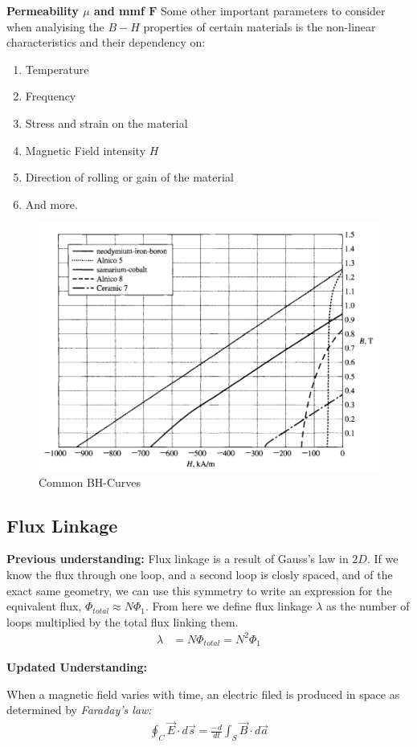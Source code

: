 \documentclass{book}
\begin{document}
\textbf{Permeability $\mu$ and mmf $\mathbf{F}$}
Some other important parameters to consider when analyising the $B-H$ properties of certain materials is the non-linear characteristics and their dependency on:
\begin{enumerate}
	\item Temperature
	\item Frequency
	\item Stress and strain on the material
	\item Magnetic Field intensity $H$
	\item Direction of rolling or gain of the material
	\item And more.
\end{enumerate}
\begin{figure}[h]
	\centering
	\includegraphics[width=0.5\linewidth]{Screenshots/Common_BH_Curves}
	\caption{Common BH-Curves}
	\label{fig:commonbhcurves}
\end{figure}

 
 \subsection{Flux Linkage}
 
 
 \textbf{Previous understanding:}
 Flux linkage is a result of Gauss's law in $2D$. If we know the flux through one loop, and a second loop is closly spaced, and of the exact same geometry, we can use this symmetry to write an expression for the equivalent flux, $\Phi_{total} \approx N \Phi_1$. From here we define flux linkage $\lambda$ as the number of loops multiplied by the total flux linking them.
 \begin{align*}
 	\lambda &= N \Phi_{total} = N^2 \Phi_1
 \end{align*}
 
 \textbf{Updated Understanding:}
 
 When a magnetic field varies with time, an electric filed is produced in space as determined by \textit{Faraday's law:}
 \begin{align*}
 	\oint_C \vec{E} \cdot d\vec{s} = \frac{-d}{dt} \int_{S} \vec{B} \cdot d\vec{a}
 \end{align*}
 
\end{document}

